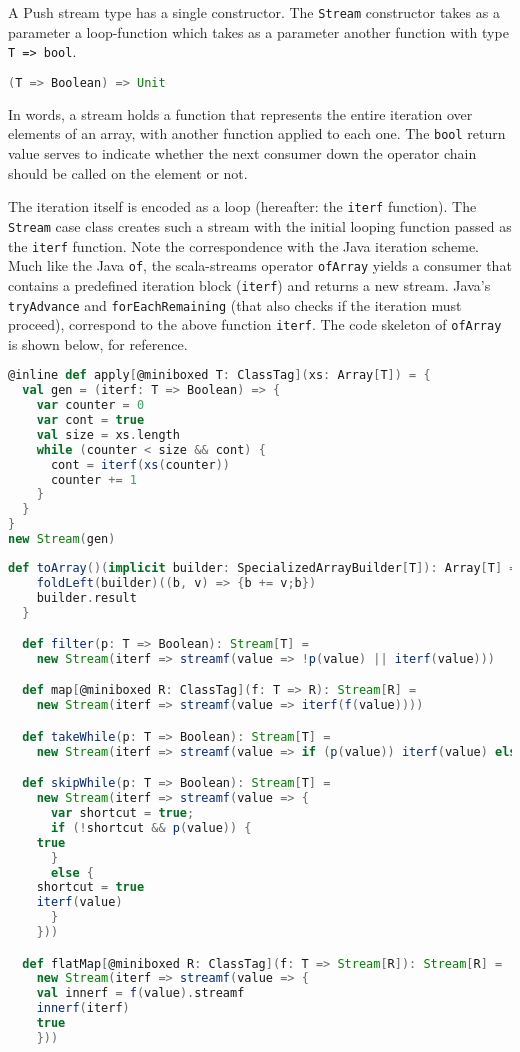 A Push stream type has a single constructor. The \verb|Stream| constructor takes
as a parameter a loop-function which takes as a parameter another function with
type \verb|T => bool|.

\begin{lstlisting}[language=Scala]
(T => Boolean) => Unit
\end{lstlisting}

In words, a stream holds a function that represents the entire iteration over
elements of an array, with another function applied to each one.  The
\verb|bool| return value serves to indicate whether the next consumer down the
operator chain should be called on the element or not.

The iteration itself is encoded as a loop (hereafter: the \verb|iterf|
function). The \verb|Stream| case class creates such a stream with the initial
looping function passed as the \verb|iterf| function. Note the correspondence
with the Java iteration scheme. Much like the Java \verb|of|, the scala-streams
operator \verb|ofArray| yields a consumer that contains a predefined iteration
block (\verb|iterf|) and returns a new stream.  Java's \verb|tryAdvance| and
\verb|forEachRemaining| (that also checks if the iteration must proceed),
correspond to the above function \verb|iterf|. The code skeleton of
\verb|ofArray| is shown below, for reference.


\begin{lstlisting}[language=scala]
@inline def apply[@miniboxed T: ClassTag](xs: Array[T]) = {
  val gen = (iterf: T => Boolean) => {
    var counter = 0
    var cont = true
    val size = xs.length
    while (counter < size && cont) {
      cont = iterf(xs(counter))
      counter += 1
    }
  }
}
new Stream(gen)
\end{lstlisting}


\begin{lstlisting}[language=scala]
  def toArray()(implicit builder: SpecializedArrayBuilder[T]): Array[T] = {
    foldLeft(builder)((b, v) => {b += v;b})
    builder.result
  }

  def filter(p: T => Boolean): Stream[T] =
    new Stream(iterf => streamf(value => !p(value) || iterf(value)))

  def map[@miniboxed R: ClassTag](f: T => R): Stream[R] = 
    new Stream(iterf => streamf(value => iterf(f(value))))

  def takeWhile(p: T => Boolean): Stream[T] = 
    new Stream(iterf => streamf(value => if (p(value)) iterf(value) else false))

  def skipWhile(p: T => Boolean): Stream[T] = 
    new Stream(iterf => streamf(value => {
      var shortcut = true;
      if (!shortcut && p(value)) {
	true
      }
      else {
	shortcut = true
	iterf(value)
      }
    }))

  def flatMap[@miniboxed R: ClassTag](f: T => Stream[R]): Stream[R] = 
    new Stream(iterf => streamf(value => {
	val innerf = f(value).streamf
	innerf(iterf)
	true
    }))
\end{lstlisting}


